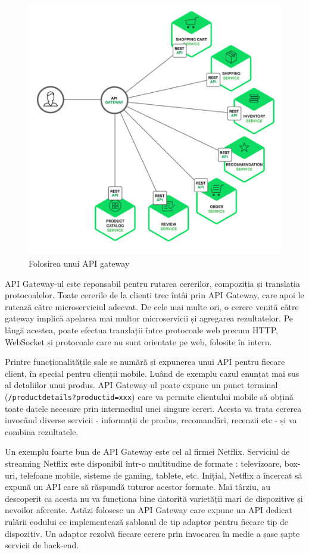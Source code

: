 \documentclass[12pt, a4paper, oneside, romanian]{teza-upb}
\begin{document}
\begin{figure}[ht]
\centering
\includegraphics[scale=0.3]{img/Richardson-microservices-part2-3_api-gateway.png}
\caption{Folosirea unui API gateway}
\label{fig:arhi_componente}
\end{figure}

API Gateway-ul este reponsabil pentru rutarea cererilor, compoziția și translația protocoalelor. Toate cererile de la clienți trec întâi prin API Gateway, care apoi le rutează către microserviciul adecvat. De cele mai multe ori, o cerere venită către gateway implică apelarea mai multor microservicii și agregarea rezultatelor. Pe lângă acestea, poate efectua tranzlații între protocoale web precum HTTP, WebSocket și protocoale care nu sunt orientate pe web, folosite în intern. 

Printre funcționalitățile sale se numără și expunerea unui API pentru fiecare client, în special pentru clienții mobile. Luând de exemplu cazul enunțat mai sus al detaliilor unui produs. API Gateway-ul poate expune un punct terminal (\texttt{/productdetails?productid=xxx}) care va permite clientului mobile să obțină toate datele necesare prin intermediul unei singure cereri. Acesta va trata cererea invocând diverse servicii - informații de produs, recomandări, recenzii etc - și va combina rezultatele. 

Un exemplu foarte bun de API Gateway este cel al firmei Netflix. Serviciul de streaming Netflix este disponibil într-o multitudine de formate : televizoare, box-uri, telefoane mobile, sisteme de gaming, tablete, etc. Inițial, Netflix a încercat să expună un API care să răspundă tuturor acestor formate. Mai târziu, au descoperit ca acesta nu va funcționa bine datorită varietății mari de dispozitive și nevoilor aferente. Astăzi folosesc un API Gateway care expune un API dedicat rulării codului ce implementează șablonul de tip adaptor pentru fiecare tip de dispozitiv. Un adaptor rezolvă fiecare cerere prin invocarea în medie a șase șapte servicii de back-end. 
\end{document}

